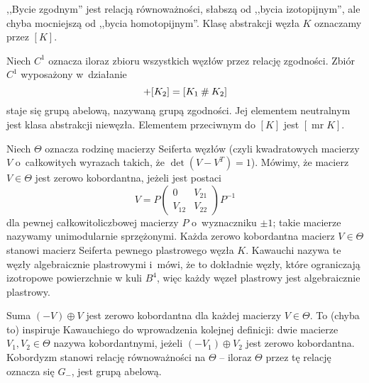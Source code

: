 ,,Bycie zgodnym'' jest relacją równoważności, słabszą od ,,bycia izotopijnym'', ale chyba mocniejszą od ,,bycia homotopijnym''.
%
Klasę abstrakcji węzła $K$ oznaczamy przez $[K]$.

\begin{definition}
%
    Niech $C^1$ oznacza iloraz zbioru wszystkich węzłów przez relację zgodności.
    Zbiór $C^1$ wyposażony w~działanie
    \begin{equation}
        [K_1] + [K_2] = [K_1 \shrap K_2]
    \end{equation}
    staje się grupą abelową, nazywaną grupą zgodności.
    Jej elementem neutralnym jest klasa abstrakcji niewęzła.
    Elementem przeciwnym do $[K]$ jest $[\operatorname{mr} K]$.
\end{definition}


Niech $\Theta$ oznacza rodzinę macierzy Seiferta węzłów (czyli kwadratowych macierzy $V$ o~całkowitych wyrazach takich, że $\det (V - V^T) = 1$).
%
Mówimy, że macierz $V \in \Theta$ jest zerowo kobordantna, jeżeli jest postaci
%
\begin{equation}
    V = P \begin{pmatrix} 0 & V_{21} \\ V_{12} & V_{22} \end{pmatrix} P^{-1}
\end{equation}
dla pewnej całkowitoliczbowej macierzy $P$ o~wyznaczniku $\pm 1$; takie macierze nazywamy unimodularnie sprzężonymi.
%
Każda zerowo kobordantna macierz $V \in \Theta$ stanowi macierz Seiferta pewnego plastrowego węzła $K$.
Kawauchi nazywa te węzły algebraicznie plastrowymi i~mówi, że to dokładnie węzły, które ograniczają izotropowe powierzchnie w kuli $B^4$, więc każdy węzeł plastrowy jest algebraicznie plastrowy.

Suma $(-V) \oplus V$ jest zerowo kobordantna dla każdej macierzy $V \in \Theta$.
To (chyba to) inspiruje Kawauchiego do wprowadzenia kolejnej definicji: dwie macierze $V_1, V_2 \in \Theta$ nazywa kobordantnymi, jeżeli $(-V_1) \oplus V_2$ jest zerowo kobordantna.
Kobordyzm stanowi relację równoważności na $\Theta$ -- iloraz $\Theta$ przez tę relację oznacza się $G_-$, jest grupą abelową.

